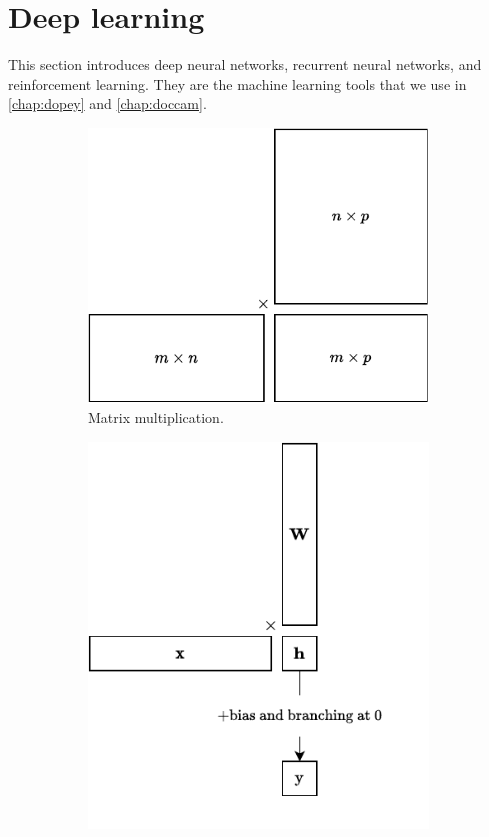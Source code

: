 \section{Deep learning}
This section introduces deep neural networks, recurrent neural networks, and
reinforcement learning. They are the machine learning tools that we use in
\cref{chap:dopey} and \cref{chap:doccam}.
\begin{figure}[t]
  \centering
  \begin{subfigure}[t]{0.35\textwidth}
    \includegraphics[width=0.99\textwidth]{figures/matmul.pdf}
    \caption{Matrix multiplication.}
    \label{fig:matmul}
	\end{subfigure}
	\begin{subfigure}[t]{0.35\textwidth}
    \includegraphics[width=0.99\textwidth]{figures/perceptron.pdf}

\end{subfigure}
\end{figure}
